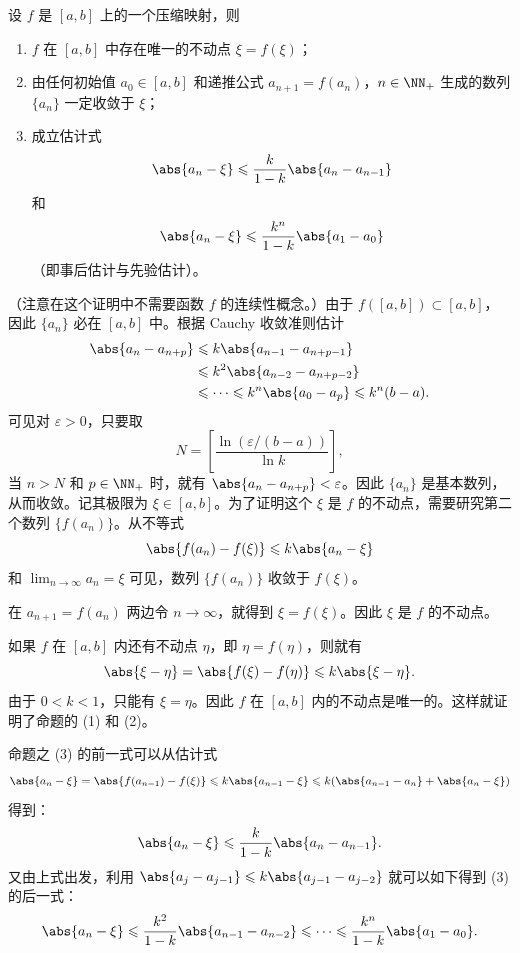 \begin{xproposition}[3.4.4（压缩映射原理）]
设 $f$ 是 $[a,b]$ 上的一个压缩映射，则
\begin{enumerate}[label=(\arabic*)]
  \item $f$ 在 $[a,b]$ 中存在唯一的不动点 $\xi=f(\xi)$；
  \item 由任何初始值 $a_0\in[a,b]$ 和递推公式 $a_{n+1}=f(a_n)$，$n\in\NN_+$ 生成的数列 $\{a_n\}$ 一定收敛于 $\xi$；
  \item 成立估计式
  \[
    \abs{a_n-\xi}\leqslant\frac{k}{1-k}\abs{a_n-a_{n-1}}
  \]
  和
  \[
    \abs{a_n-\xi}\leqslant\frac{k^n}{1-k}\abs{a_1-a_0}
  \]
  （即事后估计与先验估计）。
\end{enumerate}
\end{xproposition}
\begin{xproof}
（注意在这个证明中不需要函数 $f$ 的连续性概念。）由于 $f([a,b])\subset[a,b]$，因此 $\{a_n\}$ 必在 $[a,b]$ 中。根据 Cauchy 收敛准则估计
\begin{align*}
  \abs{a_n-a_{n+p}}
  &\leqslant k\abs{a_{n-1}-a_{n+p-1}}\\
  &\leqslant k^2\abs{a_{n-2}-a_{n+p-2}}\\
  &\leqslant\cdots\leqslant k^n\abs{a_0-a_p}\leqslant k^n(b-a).
\end{align*}
可见对 $\varepsilon>0$，只要取
\[
  N=\left[\frac{\ln(\varepsilon/(b-a))}{\ln k}\right],
\]
当 $n>N$ 和 $p\in\NN_+$ 时，就有 $\abs{a_n-a_{n+p}}<\varepsilon$。因此 $\{a_n\}$ 是基本数列，从而收敛。记其极限为 $\xi\in[a,b]$。为了证明这个 $\xi$ 是 $f$ 的不动点，需要研究第二个数列 $\{f(a_n)\}$。从不等式
\[
  \abs{f(a_n)-f(\xi)}\leqslant k\abs{a_n-\xi}
\]
和 $\lim_{n\to\infty}a_n=\xi$ 可见，数列 $\{f(a_n)\}$ 收敛于 $f(\xi)$。

在 $a_{n+1}=f(a_n)$ 两边令 $n\to\infty$，就得到 $\xi=f(\xi)$。因此 $\xi$ 是 $f$ 的不动点。

如果 $f$ 在 $[a,b]$ 内还有不动点 $\eta$，即 $\eta=f(\eta)$，则就有
\[
  \abs{\xi-\eta}=\abs{f(\xi)-f(\eta)}\leqslant k\abs{\xi-\eta}.
\]
由于 $0<k<1$，只能有 $\xi=\eta$。因此 $f$ 在 $[a,b]$ 内的不动点是唯一的。这样就证明了命题的 (1) 和 (2)。

命题之 (3) 的前一式可以从估计式
\[
  \abs{a_n-\xi}=\abs{f(a_{n-1})-f(\xi)}\leqslant k\abs{a_{n-1}-\xi}
  \leqslant k(\abs{a_{n-1}-a_n}+\abs{a_n-\xi})
\]
得到：
\[
  \abs{a_n-\xi}\leqslant\frac{k}{1-k}\abs{a_n-a_{n-1}}.
\]
又由上式出发，利用 $\abs{a_j-a_{j-1}}\leqslant k\abs{a_{j-1}-a_{j-2}}$ 就可以如下得到 (3) 的后一式：
\[
  \abs{a_n-\xi}\leqslant\frac{k^2}{1-k}\abs{a_{n-1}-a_{n-2}}\leqslant\cdots\leqslant\frac{k^n}{1-k}\abs{a_1-a_0}.
\]
\end{xproof}

